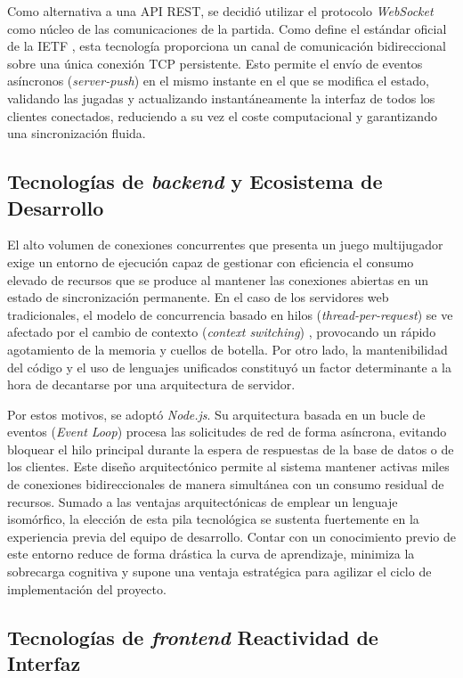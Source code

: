 Como alternativa a una API REST, se decidió utilizar el protocolo \textit{WebSocket} como núcleo de las comunicaciones de la partida. Como define el estándar oficial de la IETF \cite{rfc6455}, esta tecnología proporciona un canal de comunicación bidireccional sobre una única conexión TCP persistente. Esto permite el envío de eventos asíncronos (\textit{server-push}) en el mismo instante en el que se modifica el estado, validando las jugadas y actualizando instantáneamente la interfaz de todos los clientes conectados, reduciendo a su vez el coste computacional y garantizando una sincronización  fluida.

\subsection{Tecnologías de \textit{backend} y Ecosistema de Desarrollo}

El alto volumen de conexiones concurrentes que presenta un juego multijugador exige un entorno de ejecución capaz de gestionar con eficiencia el consumo elevado de recursos que se produce al mantener las conexiones abiertas en un estado de sincronización permanente. En el caso de los servidores web tradicionales, el modelo de concurrencia basado en hilos (\textit{thread-per-request}) se ve afectado por el cambio de contexto (\textit{context switching}) \cite{tilkov_node}, provocando un rápido agotamiento de la memoria y cuellos de botella. Por otro lado, la mantenibilidad del código y el uso de lenguajes unificados constituyó un factor determinante a la hora de decantarse por una arquitectura de servidor. 

Por estos motivos, se adoptó \textit{Node.js}. Su arquitectura basada en un bucle de eventos (\textit{Event Loop}) procesa las solicitudes de red de forma asíncrona, evitando bloquear el hilo principal durante la espera de respuestas de la base de datos o de los clientes. Este diseño arquitectónico permite al sistema mantener activas miles de conexiones bidireccionales de manera simultánea con un consumo residual de recursos. Sumado a las ventajas arquitectónicas de emplear un lenguaje isomórfico, la elección de esta pila tecnológica se sustenta fuertemente en la experiencia previa del equipo de desarrollo. Contar con un conocimiento previo de este entorno reduce de forma drástica la curva de aprendizaje, minimiza la sobrecarga cognitiva y supone una ventaja estratégica para agilizar el ciclo de implementación del proyecto.

\subsection{Tecnologías de \textit{frontend} Reactividad de Interfaz}

